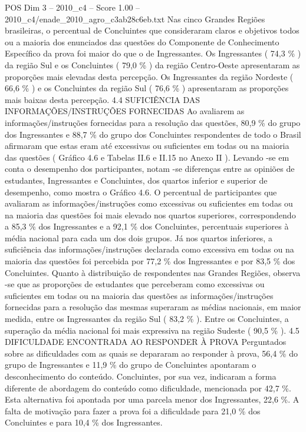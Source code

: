 \begin{textsample}{POS Dim 3 – 2010\_c4 – Score 1.00 – 2010\_c4/enade\_2010\_agro\_c3ab28c6eb.txt}
Nas cinco Grandes Regiões brasileiras, o percentual de Concluintes que consideraram claros e objetivos todos ou a maioria dos enunciados das questões do Componente de Conhecimento Específico da prova foi maior do que o de Ingressantes.
Os Ingressantes ( 74,3 \% ) da região Sul e os Concluintes ( 79,0 \% ) da região Centro-Oeste apresentaram as proporções mais elevadas desta percepção.
Os Ingressantes da região Nordeste ( 66,6 \% ) e os Concluintes da região Sul ( 76,6 \% ) apresentaram as proporções mais baixas desta percepção. 4.4 SUFICIÊNCIA DAS INFORMAÇÕES/INSTRUÇÕES FORNECIDAS Ao avaliarem as informações/instruções fornecidas para a resolução das questões, 80,9 \% do grupo dos Ingressantes e 88,7 \% do grupo dos Concluintes respondentes de todo o Brasil afirmaram que estas eram até excessivas ou suficientes em todas ou na maioria das questões ( Gráfico 4.6 e Tabelas II.6 e II.15 no Anexo II ).
Levando -se em conta o desempenho dos participantes, notam -se diferenças entre as opiniões de estudantes, Ingressantes e Concluintes, dos quartos inferior e superior de desempenho, como mostra o Gráfico 4.6.
O percentual de participantes que avaliaram as informações/instruções como excessivas ou suficientes em todas ou na maioria das questões foi mais elevado nos quartos superiores, correspondendo a 85,3 \% dos Ingressantes e a 92,1 \% dos Concluintes, percentuais superiores à média nacional para cada um dos dois grupos.
Já nos quartos inferiores, a suficiência das informações/instruções declarada como excessiva em todas ou na maioria das questões foi percebida por 77,2 \% dos Ingressantes e por 83,5 \% dos Concluintes.
Quanto à distribuição de respondentes nas Grandes Regiões, observa -se que as proporções de estudantes que perceberam como excessivas ou suficientes em todas ou na maioria das questões as informações/instruções fornecidas para a resolução das mesmas superaram as médias nacionais, em maior medida, entre os Ingressantes da região Sul ( 83,2 \% ).
Entre os Concluintes, a superação da média nacional foi mais expressiva na região Sudeste ( 90,5 \% ). 4.5 DIFICULDADE ENCONTRADA AO RESPONDER À PROVA Perguntados sobre as dificuldades com as quais se depararam ao responder à prova, 56,4 \% do grupo de Ingressantes e 11,9 \% do grupo de Concluintes apontaram o desconhecimento do conteúdo.
Concluintes, por sua vez, indicaram a forma diferente de abordagem do conteúdo como dificuldade, mencionada por 42,7 \%.
Esta alternativa foi apontada por uma parcela menor dos Ingressantes, 22,6 \%.
A falta de motivação para fazer a prova foi a dificuldade para 21,0 \% dos Concluintes e para 10,4 \% dos Ingressantes.

\end{textsample}

